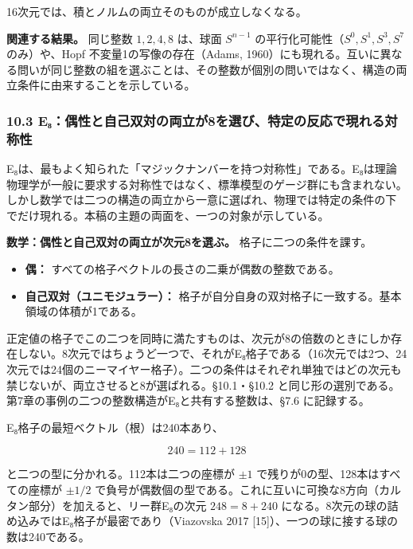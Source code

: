 \documentclass[
  a4paper,
]{ltjsarticle}
\providecommand{\tightlist}{%
  \setlength{\itemsep}{0pt}\setlength{\parskip}{0pt}}
\begin{document}
16次元では、積とノルムの両立そのものが成立しなくなる。

\textbf{関連する結果。} 同じ整数 \(1,2,4,8\) は、球面 \(S^{n-1}\)
の平行化可能性（\(S^0,S^1,S^3,S^7\) のみ）や、Hopf
不変量1の写像の存在（Adams,
1960）にも現れる。互いに異なる問いが同じ整数の組を選ぶことは、その整数が個別の問いではなく、構造の両立条件に由来することを示している。

\subsubsection{10.3
E₈：偶性と自己双対の両立が8を選び、特定の反応で現れる対称性}\label{eux2088ux5076ux6027ux3068ux81eaux5df1ux53ccux5bfeux306eux4e21ux7acbux304c8ux3092ux9078ux3073ux7279ux5b9aux306eux53cdux5fdcux3067ux73feux308cux308bux5bfeux79f0ux6027}

E₈は、最もよく知られた「マジックナンバーを持つ対称性」である。E₈は理論物理学が一般に要求する対称性ではなく、標準模型のゲージ群にも含まれない。しかし数学では二つの構造の両立から一意に選ばれ、物理では特定の条件の下でだけ現れる。本稿の主題の両面を、一つの対象が示している。

\textbf{数学：偶性と自己双対の両立が次元8を選ぶ。}
格子に二つの条件を課す。

\begin{itemize}
\tightlist
\item
  \textbf{偶：} すべての格子ベクトルの長さの二乗が偶数の整数である。
\item
  \textbf{自己双対（ユニモジュラー）：}
  格子が自分自身の双対格子に一致する。基本領域の体積が1である。
\end{itemize}

正定値の格子でこの二つを同時に満たすものは、次元が8の倍数のときにしか存在しない。8次元ではちょうど一つで、それがE₈格子である（16次元では2つ、24次元では24個のニーマイヤー格子）。二つの条件はそれぞれ単独ではどの次元も禁じないが、両立させると8が選ばれる。§10.1・§10.2
と同じ形の選別である。第7章の事例の二つの整数構造がE₈と共有する整数は、§7.6
に記録する。

E₈格子の最短ベクトル（根）は240本あり、

\[
240=112+128
\tag{15}
\]

と二つの型に分かれる。112本は二つの座標が \(\pm1\)
で残りが0の型、128本はすべての座標が \(\pm1/2\)
で負号が偶数個の型である。これに互いに可換な8方向（カルタン部分）を加えると、リー群E₈の次元
\(248=8+240\)
になる。8次元の球の詰め込みではE₈格子が最密であり（Viazovska 2017
{[}15{]}）、一つの球に接する球の数は240である。
\end{document}
